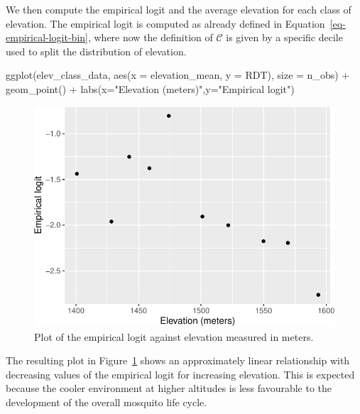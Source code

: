 \documentclass[
  letterpaper,
]{krantz}
\newenvironment{Shaded}{\begin{snugshade}}{\end{snugshade}}
\newcommand{\AttributeTok}[1]{\textcolor[rgb]{0.40,0.45,0.13}{#1}}
\newcommand{\FunctionTok}[1]{\textcolor[rgb]{0.28,0.35,0.67}{#1}}
\newcommand{\NormalTok}[1]{\textcolor[rgb]{0.00,0.23,0.31}{#1}}
\newcommand{\SpecialCharTok}[1]{\textcolor[rgb]{0.37,0.37,0.37}{#1}}
\newcommand{\StringTok}[1]{\textcolor[rgb]{0.13,0.47,0.30}{#1}}
\begin{document}
We then compute the empirical logit and the average elevation for each
class of elevation. The empirical logit is computed as already defined
in Equation~\ref{eq-empirical-logit-bin}, where now the definition of
\(\mathcal{C}\) is given by a specific decile used to split the
distribution of elevation.

\begin{Shaded}
\begin{Highlighting}[]
\FunctionTok{ggplot}\NormalTok{(elev\_class\_data, }\FunctionTok{aes}\NormalTok{(}\AttributeTok{x =}\NormalTok{ elevation\_mean, }\AttributeTok{y =}\NormalTok{ RDT), }
                           \AttributeTok{size =}\NormalTok{ n\_obs) }\SpecialCharTok{+} 
  \FunctionTok{geom\_point}\NormalTok{() }\SpecialCharTok{+} 
  \FunctionTok{labs}\NormalTok{(}\AttributeTok{x=}\StringTok{"Elevation (meters)"}\NormalTok{,}\AttributeTok{y=}\StringTok{"Empirical logit"}\NormalTok{)  }
\end{Highlighting}
\end{Shaded}

\begin{figure}[H]

{\centering \includegraphics{03_model-fitting_files/figure-pdf/fig-elogit-elev-malkenya-1.pdf}

}

\caption{\label{fig-elogit-elev-malkenya}Plot of the empirical logit
against elevation measured in meters.}

\end{figure}

The resulting plot in Figure~\ref{fig-elogit-elev-malkenya} shows an
approximately linear relationship with decreasing values of the
empirical logit for increasing elevation. This is expected because the
cooler environment at higher altitudes is less favourable to the
development of the overall mosquito life cycle.
\end{document}
